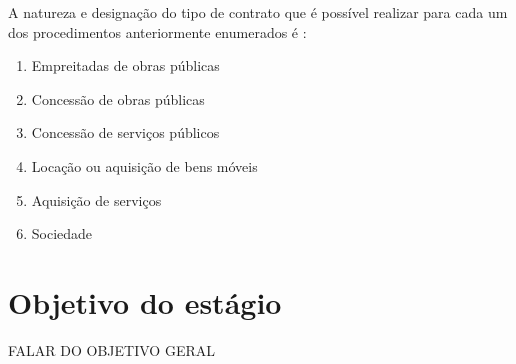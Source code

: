 
A natureza e designação do tipo de contrato que é possível realizar para cada um dos procedimentos anteriormente enumerados é : 

\begin{enumerate}
	\setlength\itemsep{.01cm}
	\item Empreitadas de obras públicas
	\item Concessão de obras públicas
	\item Concessão de serviços públicos
	\item Locação ou aquisição de bens móveis
	\item Aquisição de serviços
	\item Sociedade
\end{enumerate}


\section{Objetivo do estágio}

FALAR DO OBJETIVO GERAL 
\\
\\




